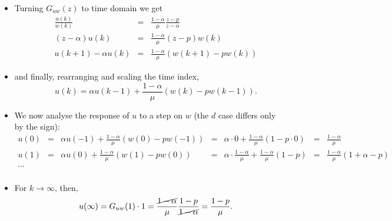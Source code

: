\begin{frame}
\myPause
 \begin{itemize}[<+-| alert@+>]
 \item Turning $G_{uw}(z)$ to time domain we get
       \begin{displaymath}
         \begin{array}{rcl}
          \frac{u(k)}{w(k)}  &=& \frac{1-\alpha}{\mu}\frac{z-p}{z-\alpha} \\  
          (z-\alpha) u(k)    &=& \frac{1-\alpha}{\mu}(z-p) w(k) \\
          u(k+1)-\alpha u(k) &=& \frac{1-\alpha}{\mu} \left( w(k+1)-pw(k) \right)
         \end{array}
       \end{displaymath}
 \item and finally, rearranging and scaling the time index,
       \begin{displaymath}
        u(k) = \alpha u(k-1)+\frac{1-\alpha}{\mu} \left( w(k)-pw(k-1) \right).
       \end{displaymath}
 \end{itemize}
\end{frame}

\begin{frame}
\myPause
 \begin{itemize}[<+-| alert@+>]
 \item We now analyse the response of $u$ to a step on $w$ (the $d$ case differs only\\
       by the sign):
       {\small
       \begin{displaymath}
         \begin{array}{rclclcl}
          u(0) &=& \alpha u(-1)   + \frac{1-\alpha}{\mu} \left( w(0) - p       w(-1) \right)
               &=& \alpha \cdot 0 + \frac{1-\alpha}{\mu} \left( 1    - p \cdot 0     \right)
               &=& \frac{1-\alpha}{\mu} \\
          u(1) &=& \alpha u(0)    + \frac{1-\alpha}{\mu} \left( w(1) - p       w(0)  \right)
               &=& \alpha \cdot \frac{1-\alpha}{\mu} + \frac{1-\alpha}{\mu} \left( 1-p\right)
               &=& \frac{1-\alpha}{\mu} (1+\alpha-p) \\
          \cdots\\
         \end{array}
       \end{displaymath}
       }
 \item For $k\rightarrow\infty$, then,
       \begin{displaymath}
        u(\infty) = G_{uw}(1) \cdot 1
                  =  \frac{\cancel{1-\alpha}}{\mu}\frac{1-p}{\cancel{1-\alpha}}
                  = \frac{1-p}{\mu}.
       \end{displaymath}
 \end{itemize}
\end{frame}

